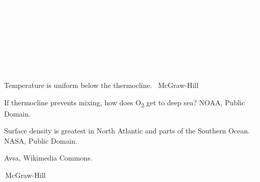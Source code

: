 \documentclass[t,handout]{beamer}  %
\begin{document}

{
\begin{frame}[t]{\textcolor{white}{The \textcolor{orange5}{deep sea} is the largest habitat on Earth.}}
\end{frame}}

{
\begin{frame}[t]{\textcolor{white}{List the environmental parameters that affect the biology of deep-sea organisms.}}

\hangpara\parbox{0.45\textwidth}{\raggedright\textcolor{white}{Then, pick one that you think most affects the deep-sea community interactions and explain why.}}

\hangpara\parbox{0.45\textwidth}{\textcolor{white}{Do this for both the mesopelagic and the bathypelagic communities.}}

\end{frame}}

{
\begin{frame}[b]{Temperature is uniform below the thermocline.}
\tiny\textcopyright\, McGraw-Hill
\end{frame}}

{
\begin{frame}[b]{If thermocline prevents mixing, how does O\textsubscript{2} get to deep sea?}
\tiny NOAA, Public Domain.
\end{frame}}

{
\begin{frame}[b]{Surface density is greatest in North Atlantic and parts of the Southern Ocean.}
\tiny NASA, Public Domain.
\end{frame}}


{
\begin{frame}[b]
\tiny Avsa, Wikimedia Commons.
\end{frame}}


{
\begin{frame}[b]
\tiny\textcopyright\,McGraw-Hill
\end{frame}}
\end{document}
